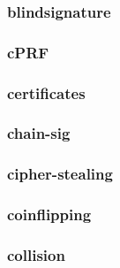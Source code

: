 \begin{frame}\frametitle{blindsignature}
\begin{figure}
\begin{center}

\end{center}
\end{figure}
\end{frame}
\begin{frame}\frametitle{cPRF}
\begin{figure}
\begin{center}

\end{center}
\end{figure}
\end{frame}
\begin{frame}\frametitle{certificates}
\begin{figure}
\begin{center}

\end{center}
\end{figure}
\end{frame}
\begin{frame}\frametitle{chain-sig}
\begin{figure}
\begin{center}

\end{center}
\end{figure}
\end{frame}
\begin{frame}\frametitle{cipher-stealing}
\begin{figure}
\begin{center}

\end{center}
\end{figure}
\end{frame}
\begin{frame}\frametitle{coinflipping}
\begin{figure}
\begin{center}

\end{center}
\end{figure}
\end{frame}
\begin{frame}\frametitle{collision}
\begin{figure}
\begin{center}

\end{center}
\end{figure}
\end{frame}
